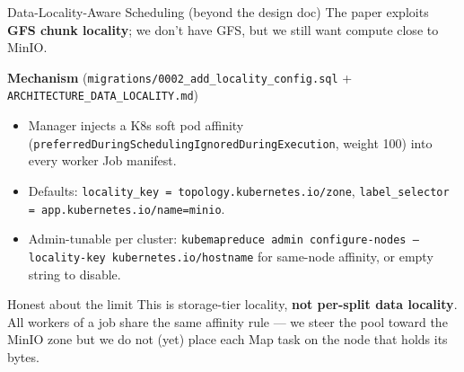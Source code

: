 \documentclass[11pt]{beamer}
\begin{document}
\begin{frame}{Data-Locality-Aware Scheduling (beyond the design doc)}
The paper exploits \textbf{GFS chunk locality}; we don't have GFS, but we still
want compute close to MinIO.

\vspace{0.3em}
\textbf{Mechanism} (\texttt{migrations/0002\_add\_locality\_config.sql} +
\texttt{ARCHITECTURE\_DATA\_LOCALITY.md})
\begin{itemize}\small
  \item Manager injects a K8s \alert{soft pod affinity}
        (\texttt{preferredDuringSchedulingIgnoredDuringExecution}, weight 100)
        into every worker Job manifest.
  \item Defaults: \texttt{locality\_key = topology.kubernetes.io/zone},
        \texttt{label\_selector = app.kubernetes.io/name=minio}.
  \item Admin-tunable per cluster:
        \texttt{kubemapreduce admin configure-nodes --locality-key kubernetes.io/hostname}
        for same-node affinity, or empty string to disable.
\end{itemize}

\begin{alertblock}{Honest about the limit}
This is \alert{storage-tier locality}, \textbf{not per-split data locality}.
All workers of a job share the same affinity rule --- we steer the pool toward the
MinIO zone but we do not (yet) place each Map task on the node that holds its bytes.
\end{alertblock}
\end{frame}
\end{document}
